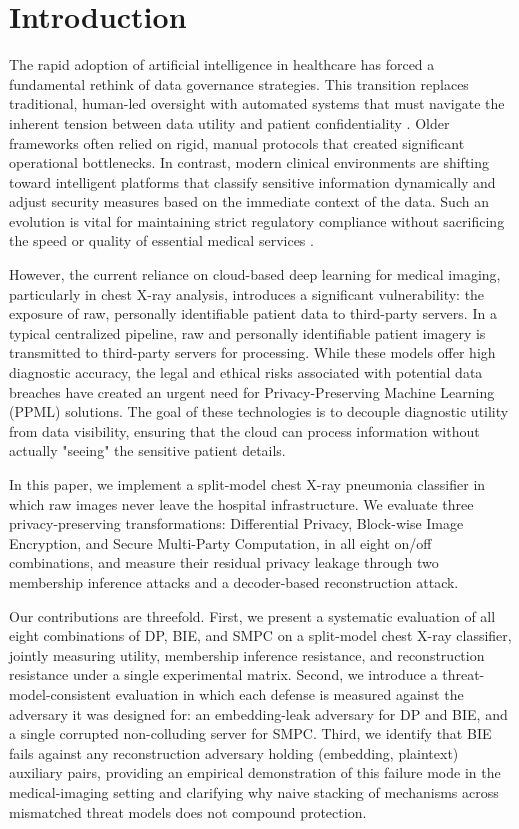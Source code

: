 \documentclass[conference]{IEEEtran}
\begin{document}
\section{Introduction}
The rapid adoption of artificial intelligence in healthcare has forced a fundamental rethink of data governance strategies. This transition replaces traditional, human-led oversight with automated systems that must navigate the inherent tension between data utility and patient confidentiality \cite{b1}. Older frameworks often relied on rigid, manual protocols that created significant operational bottlenecks. In contrast, modern clinical environments are shifting toward intelligent platforms that classify sensitive information dynamically and adjust security measures based on the immediate context of the data. Such an evolution is vital for maintaining strict regulatory compliance without sacrificing the speed or quality of essential medical services \cite{b1}.

However, the current reliance on cloud-based deep learning for medical imaging, particularly in chest X-ray analysis, introduces a significant vulnerability: the exposure of raw, personally identifiable patient data to third-party servers. In a typical centralized pipeline, raw and personally identifiable patient imagery is transmitted to third-party servers for processing. While these models offer high diagnostic accuracy, the legal and ethical risks associated with potential data breaches have created an urgent need for Privacy-Preserving Machine Learning (PPML) solutions. The goal of these technologies is to decouple diagnostic utility from data visibility, ensuring that the cloud can process information without actually "seeing" the sensitive patient details.


In this paper, we implement a split-model chest X-ray pneumonia classifier in which raw images never leave the hospital infrastructure. We evaluate three privacy-preserving transformations: Differential Privacy, Block-wise Image Encryption, and Secure Multi-Party Computation, in all eight on/off combinations, and measure their residual privacy leakage through two membership inference attacks and a decoder-based reconstruction attack.

Our contributions are threefold. First, we present a systematic evaluation of all eight combinations of DP, BIE, and SMPC on a split-model chest X-ray classifier, jointly measuring utility, membership inference resistance, and reconstruction resistance under a single experimental matrix. Second, we introduce a threat-model-consistent evaluation in which each defense is measured against the adversary it was designed for: an embedding-leak adversary for DP and BIE, and a single corrupted non-colluding server for SMPC. Third, we identify that BIE fails against any reconstruction adversary holding (embedding, plaintext) auxiliary pairs, providing an empirical demonstration of this failure mode in the medical-imaging setting and clarifying why naive stacking of mechanisms across mismatched threat models does not compound protection.
\end{document}
